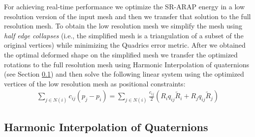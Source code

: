\documentclass{birkjour}
\numberwithin{equation}{section}
\begin{document}
For achieving real-time performance we optimize the SR-ARAP energy in a low resolution version of the input mesh and then we transfer that solution to the full resolution mesh. To obtain the low resolution mesh we simplify the mesh using \emph{half edge collapses} (i.e., the simplified mesh is a triangulation of a subset of the original vertices) while minimizing the Quadrics error metric.
After we obtained the optimal deformed shape on the simplified mesh we transfer the optimized rotations to the full resolution mesh using Harmonic Interpolation of quaternions (see Section \ref{section:harmonic_interpolation_rotors}) and then solve the following linear system using the optimized vertices of the low resolution mesh as positional constraints:
\begin{eqnarray*}
\sum_{j \in N(i)} { c_{ij} (p_j - p_i) } = \sum_{j \in N(i)} { \frac{c_{ij}}{2} (R_i q_{ij} \tilde  R_i + R_j q_{ij} \tilde R_j) }
\end{eqnarray*}

\subsection{Harmonic Interpolation of Quaternions}
\label{section:harmonic_interpolation_rotors}
\end{document}
